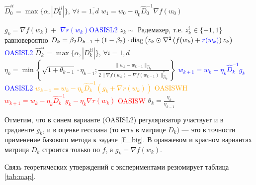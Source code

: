 \begin{algorithm}[H]
\caption{Различные способы добавления регуляризации для OASIS}\label{alg:OASIS}
\begin{algorithmic}
    \State $\hat{D}_0^{ii} = \max \{\alpha, |D_0^{ii}| \}$, $\forall i = \overline{1, d}$
    \State $w_1 = w_0 - \eta_0 \hat{D}_0^{-1} \nabla f(w_0)$

    \State $g_k = \nabla f(w_k) +$ \textcolor{blue}{$\nabla r(w_{k})$}\hfill \textcolor{blue}{OASISL2}
    \State $z_k \sim$ Радемахер, т.е. $z_k^i \in \{-1, 1\}$ равновероятно
    \State $D_k = \beta_2 D_{k-1} + (1-\beta_2) \cdot \mathrm{diag}\left( z_k \odot \nabla^2 \left(f(w_k) + \textcolor{blue}{r(w_k)} \right) z_k \right)$ \hfill \textcolor{blue}{OASISL2}
    \State $\hat{D}_k^{ii} = \max \{\alpha, |D_k^{ii}| \}$, $\forall i = \overline{1, d}$
    \State $\eta_k = \min \left\{ \sqrt{1 + \theta_{k-1}} \cdot \eta_{k-1}; \frac{\|w_k - w_{k-1}\|_{\hat{D}_k}}{2 \|\nabla f(w_k) - \nabla f(w_{k-1}) \|_{\hat{D}_k}^* } \right\}$
    \State \textcolor{blue}{$w_{k+1} = w_k - \eta_k \hat{D}_k^{-1} g_k$} \hfill \textcolor{blue}{OASISL2}
    \State \textcolor{orange}{$w_{k+1} = w_k - \eta_k \hat{D}_k^{-1} \left(g_k + \nabla r(w_k)\right)$} \hfill \textcolor{orange}{OASISWH}
    \State \textcolor{red}{$w_{k+1} = w_k - \eta_k \hat{D}_k^{-1} g_k - \eta_k \nabla r(w_k)$} \hfill \textcolor{red}{OASISW}
    \State $\theta_k = \frac{\eta_k}{\eta_{k-1}}$
    \EndFor
\end{algorithmic}
\end{algorithm}

Отметим, что в синем варианте (OASISL2) регуляризатор участвует и в градиенте $g_k$, и в оценке гессиана (то есть в матрице $D_k$) --- это в точности применение базового метода к задаче \eqref{F_big}. В оранжевом и красном вариантах матрица $D_k$ строится только по $f$, а $g_k = \nabla f(w_k)$.

Связь теоретических утверждений с экспериментами резюмирует таблица \ref{tab:map}.

